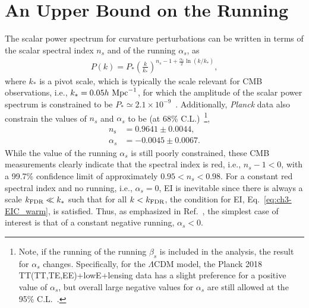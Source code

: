 \section{An Upper Bound on the Running}
\label{sec:ch3-upper}

The scalar power spectrum for curvature perturbations can be written
in terms of the scalar spectral index $n_s$ and of the running
$\alpha_s$, as
%
\begin{eqnarray}    P(k)=P_*\left(\frac{k}{k_*}\right)^{n_s-1+\frac{\alpha_s}{2}
    \ln(k/k_*)},
\end{eqnarray}
%
where $k_*$ is a pivot scale, which is typically the scale relevant
for CMB observations, i.e., $k_*=0.05h~\rm{Mpc}^{-1}$, for which the
amplitude of the scalar power spectrum is constrained to be $P_*\simeq
2.1 \times 10^{-9}$~\cite{Planck:2018vyg}. Additionally,
\textit{Planck} data also constrain the values of $n_s$ and $\alpha_s$
to be (at 68\% C.L.)~\cite{Planck:2018jri}\footnote{ Note, if the
running of the running $\beta_s$ is included in the analysis, the
result for $\alpha_s$ changes. Specifically, for the $\Lambda$CDM
model, the Planck 2018 TT(TT,TE,EE)+lowE+lensing  data has a slight
preference for a positive value of $\alpha_s$, but overall large
negative values for $\alpha_s$ are still allowed at the 95\%
C.L.~\cite{Planck:2018jri}.},
%
     \begin{align}
n_{\mathrm{s}} & =0.9641 \pm 0.0044, \\ \alpha_s & =-0.0045 \pm
0.0067. \label{eq:ch3-Planck_alphaS}
     \end{align}
%
While the value of the running $\alpha_s$ is still poorly constrained,
these CMB measurements clearly indicate that the spectral index is
red, i.e., $n_s-1<0$, with a 99.7\% confidence limit of approximately
$0.95<n_s<0.98$. {}For a constant red spectral index and no running,
i.e., $\alpha_s=0$, EI is inevitable since there is always a scale
$k_{\rm{FDR}}\ll k_*$ such that for all $k<k_{\rm{FDR}}$, the
condition for EI, Eq.~\ref{eq:ch3-EIC_warm}, is satisfied.  Thus, as
emphasized in Ref.~\cite{Kinney:2014jya}, the simplest case of
interest is that of a constant negative running, $\alpha_s<0$.

